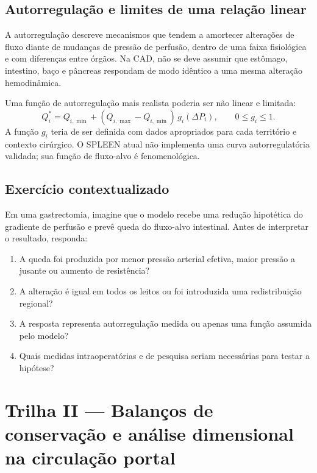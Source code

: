 \documentclass[11pt,a4paper,oneside]{book}
\begin{document}
\section{Autorregulação e limites de uma relação linear}
A autorregulação descreve mecanismos que tendem a amortecer alterações de fluxo diante de mudanças de pressão de perfusão, dentro de uma faixa fisiológica e com diferenças entre órgãos. Na CAD, não se deve assumir que estômago, intestino, baço e pâncreas respondam de modo idêntico a uma mesma alteração hemodinâmica.

Uma função de autorregulação mais realista poderia ser não linear e limitada:
\begin{equation}
Q_i^*=Q_{i,\min}+
(Q_{i,\max}-Q_{i,\min})\,g_i(\Delta P_i),
\qquad 0\leq g_i\leq1.
\end{equation}
A função $g_i$ teria de ser definida com dados apropriados para cada território e contexto cirúrgico. O SPLEEN atual não implementa uma curva autorregulatória validada; sua função de fluxo-alvo é fenomenológica.

\section{Exercício contextualizado}
Em uma gastrectomia, imagine que o modelo recebe uma redução hipotética do gradiente de perfusão e prevê queda do fluxo-alvo intestinal. Antes de interpretar o resultado, responda:
\begin{enumerate}
  \item A queda foi produzida por menor pressão arterial efetiva, maior pressão a jusante ou aumento de resistência?
  \item A alteração é igual em todos os leitos ou foi introduzida uma redistribuição regional?
  \item A resposta representa autorregulação medida ou apenas uma função assumida pelo modelo?
  \item Quais medidas intraoperatórias e de pesquisa seriam necessárias para testar a hipótese?
\end{enumerate}

\chapter{Trilha II — Balanços de conservação e análise dimensional na circulação portal}
\end{document}
